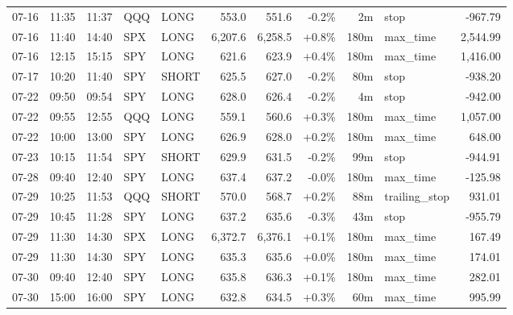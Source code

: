 \documentclass[11pt,a4paper,twoside]{article}
\begin{document}
\begin{center}
\begin{longtable}{>{\color{txtmain}}l l l l l r r r r >{\color{txtmain}}l r}
07-16 & 11:35 & 11:37 & QQQ & LONG & 553.0 & 551.6 & \textcolor{lossred}{-0.2\%} & 2m & stop & \textcolor{lossred}{-967.79} \\
07-16 & 11:40 & 14:40 & SPX & LONG & 6,207.6 & 6,258.5 & \textcolor{wingreen}{+0.8\%} & 180m & max\_time & \textcolor{wingreen}{2,544.99} \\
07-16 & 12:15 & 15:15 & SPY & LONG & 621.6 & 623.9 & \textcolor{wingreen}{+0.4\%} & 180m & max\_time & \textcolor{wingreen}{1,416.00} \\
07-17 & 10:20 & 11:40 & SPY & SHORT & 625.5 & 627.0 & \textcolor{lossred}{-0.2\%} & 80m & stop & \textcolor{lossred}{-938.20} \\
07-22 & 09:50 & 09:54 & SPY & LONG & 628.0 & 626.4 & \textcolor{lossred}{-0.2\%} & 4m & stop & \textcolor{lossred}{-942.00} \\
07-22 & 09:55 & 12:55 & QQQ & LONG & 559.1 & 560.6 & \textcolor{wingreen}{+0.3\%} & 180m & max\_time & \textcolor{wingreen}{1,057.00} \\
07-22 & 10:00 & 13:00 & SPY & LONG & 626.9 & 628.0 & \textcolor{wingreen}{+0.2\%} & 180m & max\_time & \textcolor{wingreen}{648.00} \\
07-23 & 10:15 & 11:54 & SPY & SHORT & 629.9 & 631.5 & \textcolor{lossred}{-0.2\%} & 99m & stop & \textcolor{lossred}{-944.91} \\
07-28 & 09:40 & 12:40 & SPY & LONG & 637.4 & 637.2 & \textcolor{lossred}{-0.0\%} & 180m & max\_time & \textcolor{lossred}{-125.98} \\
07-29 & 10:25 & 11:53 & QQQ & SHORT & 570.0 & 568.7 & \textcolor{wingreen}{+0.2\%} & 88m & trailing\_stop & \textcolor{wingreen}{931.01} \\
07-29 & 10:45 & 11:28 & SPY & LONG & 637.2 & 635.6 & \textcolor{lossred}{-0.3\%} & 43m & stop & \textcolor{lossred}{-955.79} \\
07-29 & 11:30 & 14:30 & SPX & LONG & 6,372.7 & 6,376.1 & \textcolor{wingreen}{+0.1\%} & 180m & max\_time & \textcolor{wingreen}{167.49} \\
07-29 & 11:30 & 14:30 & SPY & LONG & 635.3 & 635.6 & \textcolor{wingreen}{+0.0\%} & 180m & max\_time & \textcolor{wingreen}{174.01} \\
07-30 & 09:40 & 12:40 & SPY & LONG & 635.8 & 636.3 & \textcolor{wingreen}{+0.1\%} & 180m & max\_time & \textcolor{wingreen}{282.01} \\
07-30 & 15:00 & 16:00 & SPY & LONG & 632.8 & 634.5 & \textcolor{wingreen}{+0.3\%} & 60m & max\_time & \textcolor{wingreen}{995.99} \\

\end{longtable}
\end{center}
\end{document}
